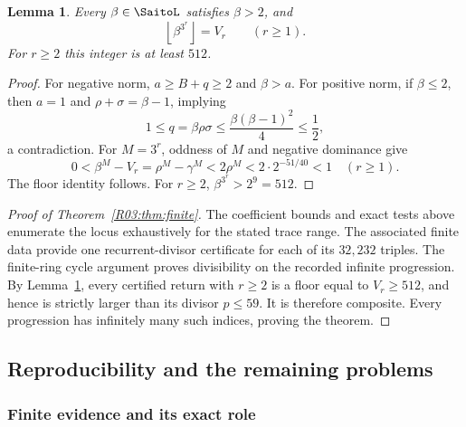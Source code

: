 \documentclass[11pt,a4paper]{article}
\newtheorem{lemma}[theorem]{Lemma}\newtheorem{proposition}[theorem]{Proposition}
\theoremstyle{definition}\newtheorem{definition}[theorem]{Definition}
\theoremstyle{remark}\newtheorem{remark}[theorem]{Remark}
\newcommand{\floor}[1]{\left\lfloor#1\right\rfloor}
\begin{document}
\begin{lemma}\label{R03:lem:uniform-floor}
Every $\beta\in\SaitoL$ satisfies $\beta>2$, and
\[
 \floor{\beta^{3^r}}=V_r\qquad(r\ge1).
\]
For $r\ge2$ this integer is at least $512$.
\end{lemma}
\begin{proof}
For negative norm, $a\ge B+q\ge2$ and $\beta>a$.
For positive norm, if $\beta\le2$, then $a=1$ and
$\rho+\sigma=\beta-1$, implying
\[
 1\le q=\beta\rho\sigma
 \le\frac{\beta(\beta-1)^2}{4}\le\frac12,
\]
a contradiction. For $M=3^r$, oddness of $M$ and negative dominance
give
\[
 0<\beta^M-V_r=\rho^M-\gamma^M<2\rho^M
 <2\cdot2^{-51/40}<1\quad(r\ge1).
\]
The floor identity follows. For $r\ge2$, $\beta^{3^r}>2^9=512$.
\end{proof}

\begin{proof}[Proof of Theorem~\ref{R03:thm:finite}]
The coefficient bounds and exact tests above enumerate the locus
exhaustively for the stated trace range. The associated finite data
provide one recurrent-divisor certificate for each of its $32,232$
triples. The finite-ring cycle argument proves divisibility on the
recorded infinite progression. By Lemma~\ref{R03:lem:uniform-floor},
every certified return with $r\ge2$ is a floor equal to $V_r\ge512$,
and hence is strictly larger than its divisor $p\le59$. It is
therefore composite. Every progression has infinitely many such
indices, proving the theorem.
\end{proof}

\subsection{Reproducibility and the remaining problems}\label{R03:sec:limits}

\subsubsection{Finite evidence and its exact role}
\end{document}
